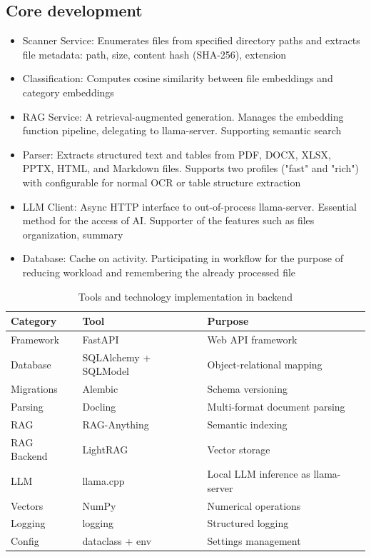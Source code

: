 \documentclass[12pt,oneside,openright,a4paper]{cpe-english-project}
\begin{document}
\subsection*{Core development}
\begin{itemize}
\item Scanner Service: Enumerates files from specified directory paths and extracts file metadata: path, size, content hash (SHA-256), extension
\item Classification: Computes cosine similarity between file embeddings and category embeddings
\item RAG Service: A retrieval-augmented generation. Manages the embedding function pipeline, delegating to llama-server. Supporting semantic search
\item Parser: Extracts structured text and tables from PDF, DOCX, XLSX, PPTX, HTML, and Markdown files. Supports two profiles ("fast" and "rich") with configurable for normal OCR or table structure extraction
\item LLM Client: Async HTTP interface to out-of-process llama-server. Essential method for the access of AI. Supporter of the features such as files organization, summary
\item Database: Cache on activity. Participating in workflow for the purpose of reducing workload and remembering the already processed file
\end{itemize}
\begin{longtable}{|p{}|p{}|p{}|}
\caption{Tools and technology implementation in backend}\\
\hline
\textbf{Category} & \textbf{Tool} & \textbf{Purpose} \\
\hline
Framework & FastAPI & Web API framework \\
\hline
Database & SQLAlchemy + SQLModel & Object-relational mapping \\
\hline
Migrations & Alembic & Schema versioning \\
\hline
Parsing & Docling & Multi-format document parsing \\
\hline
RAG & RAG-Anything & Semantic indexing \\
\hline
RAG Backend & LightRAG & Vector storage \\
\hline
LLM & llama.cpp & Local LLM inference as llama-server \\
\hline
Vectors & NumPy & Numerical operations \\
\hline
Logging & logging & Structured logging \\
\hline
Config & dataclass + env & Settings management \\
\hline
\end{longtable}
\end{document}
